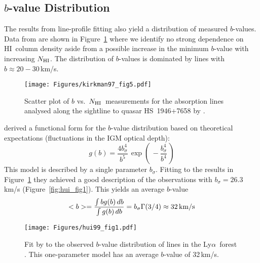 \documentclass[graybox]{svmult}
\newcommand{\HI}{H{\sc I}}
\def\lya{Ly$\alpha$}
\def\ltp{\left ( \,}
\def\rtp{\, \right  ) }
\newcommand{\mnhi}{N_{\rm HI}}
\newcommand{\nhi}{$\mnhi$}
\begin{document}
\subsection{$b$-value Distribution}

The results from  line-profile fitting also yield 
a distribution of measured $b$-values.
Data from \cite{kt97} are shown in 
Figure~\ref{fig:kt97_bN_scatter} where we identify
no strong dependence on \HI\ column density aside from
a possible increase in the minimum $b$-value with increasing \nhi.
The distribution of $b$-values is dominated by lines with
$b \approx 20-30$\,km/s.

%
\begin{figure}[b]
\sidecaption
\texttt{[image: Figures/kirkman97\_fig5.pdf]}
%
%
\caption{Scatter plot of $b$ vs.\ \nhi\ measurements for
the absorption lines analysed along the sightline
to quasar HS~1946+7658 by \cite{kt97}.
}
\label{fig:kt97_bN_scatter}       %
\end{figure}

\cite{hui99} derived a functional form for the $b$-value
distribution based on theoretical expectations (fluctuations
in the IGM optical depth):
\begin{equation}
g(b) = \frac{4 b_\sigma^4}{b^5} \, \exp \ltp - \frac{b_\sigma^4}{b^4} \rtp
\end{equation}
This model is described by a single parameter $b_\sigma$.
Fitting to the results in Figure~\ref{fig:kt97_bN_scatter}
they achieved a 
good description of the observations with $b_\sigma = 26.3$ km/s
(Figure~\ref{fig:hui_fig1}).
This yields an average $b$-value
\begin{equation}
<b> = \frac{\int b g(b) \, db}{\int g(b) \, db} = b_\sigma \Gamma(3/4)
\approx 32 \, {\rm km/s}
\end{equation}

%
\begin{figure}[b]
\sidecaption
\texttt{[image: Figures/hui99\_fig1.pdf]}
%
%
\caption{Fit by \cite{hui99} to the observed $b$-value distribution of
lines in the \lya\ forest \cite{kt97}.  This one-parameter
model has an average $b$-value of 32\,km/s.
}
\label{fig:hui99_fig1}       %
\end{figure}
\end{document}

